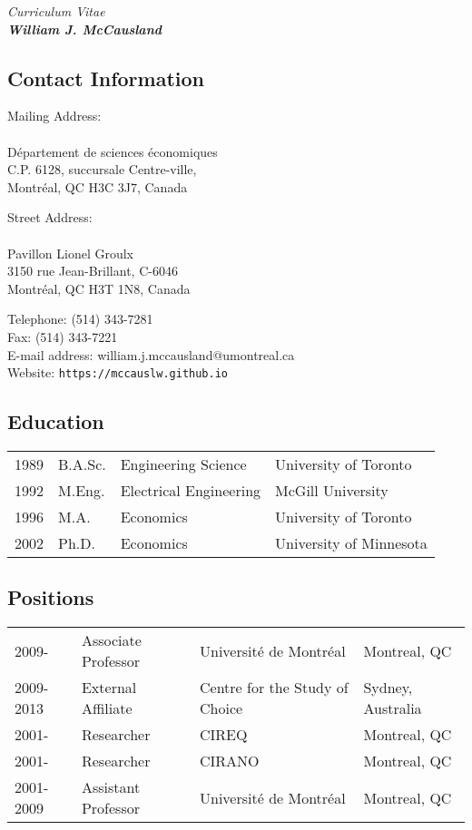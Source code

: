\documentclass[12pt]{article}
\begin{document}
{\large
\begin{center}
\it{Curriculum Vitae}\\
\bf{William J. McCausland}\\
\end{center}
}

\subsection*{Contact Information}

\parbox{8cm}{
Mailing Address: \\
\\
D\'epartement de sciences \'economiques \\
C.P. 6128, succursale Centre-ville, \\
Montr\'eal, QC H3C 3J7, Canada \\
}
\parbox{7cm}{
Street Address: \\
\\
Pavillon Lionel Groulx \\
3150 rue Jean-Brillant, C-6046 \\
Montr\'eal, QC H3T 1N8, Canada \\
}

Telephone:  (514) 343-7281 \\
Fax:  (514) 343-7221 \\
E-mail address:  william.j.mccausland@umontreal.ca \\
Website: \verb+https://mccauslw.github.io+

\subsection*{Education}

\begin{tabular}{llll}
1989 & B.A.Sc. & Engineering Science & University of Toronto \\
1992 & M.Eng. & Electrical Engineering & McGill University \\
1996 & M.A. & Economics & University of Toronto \\
2002 & Ph.D. & Economics & University of Minnesota \\
\end{tabular}

\subsection*{Positions}

\begin{tabular}{llll}
2009- & Associate Professor & Universit\'e de Montr\'eal & Montreal, QC\\
2009-2013 & External Affiliate & Centre for the Study of Choice & Sydney, Australia\\
2001- & Researcher & CIREQ & Montreal, QC\\
2001- & Researcher & CIRANO & Montreal, QC\\
2001-2009 & Assistant Professor & Universit\'e de Montr\'eal & Montreal, QC\\
\end{tabular}
\end{document}

